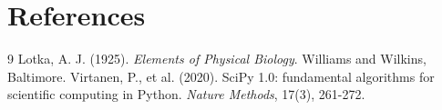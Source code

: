 \documentclass[12pt]{article}
\begin{document}
\section{References}
\begin{thebibliography}{9}
Lotka, A. J. (1925). \textit{Elements of Physical Biology}. Williams and Wilkins, Baltimore.
Virtanen, P., et al. (2020). SciPy 1.0: fundamental algorithms for scientific computing in Python. \textit{Nature Methods}, 17(3), 261-272.
\end{thebibliography}
\end{document}
